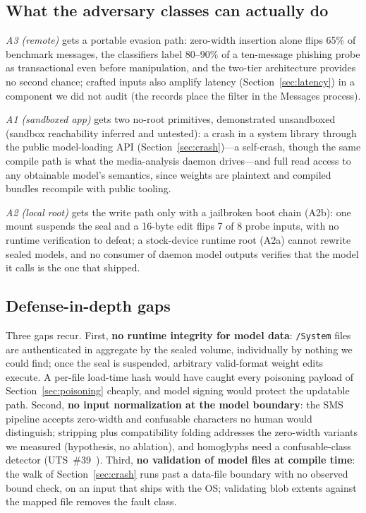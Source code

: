 \documentclass[letterpaper,twocolumn,10pt]{article}
\begin{document}
\subsection{What the adversary classes can actually do}

\emph{A3 (remote)} gets a portable evasion path: zero-width insertion alone
flips 65\% of benchmark messages, the classifiers label 80--90\% of a
ten-message phishing probe as transactional even before manipulation, and
the two-tier architecture provides no second chance; crafted inputs also
amplify latency (Section~\ref{sec:latency}) in a component we did not audit
(the records place the filter in the Messages process).

\emph{A1 (sandboxed app)} gets two no-root primitives, demonstrated
unsandboxed (sandbox reachability inferred and untested): a crash in a
system library through the public model-loading API
(Section~\ref{sec:crash})---a self-crash, though the same compile path is
what the media-analysis daemon drives---and full read
access to any obtainable model's semantics, since weights are plaintext
and compiled bundles recompile with public tooling.

\emph{A2 (local root)} gets the write path only with a jailbroken boot
chain (A2b): one mount suspends the seal and a 16-byte edit flips 7 of 8
probe inputs, with no runtime verification to defeat; a stock-device
runtime root (A2a) cannot rewrite sealed models, and no consumer of daemon
model outputs verifies that the model it calls is the one that shipped.

\subsection{Defense-in-depth gaps}

Three gaps recur.
First, \textbf{no runtime integrity for model data}: \texttt{/System} files
are authenticated in aggregate by the sealed volume, individually by
nothing we could find; once the seal is suspended, arbitrary valid-format
weight edits execute.
A per-file load-time hash would have caught every poisoning payload of
Section~\ref{sec:poisoning} cheaply, and model signing would protect the
updatable path.
Second, \textbf{no input normalization at the model boundary}: the SMS
pipeline accepts zero-width and confusable characters no human would
distinguish; stripping plus compatibility folding addresses the zero-width
variants we measured (hypothesis, no ablation), and homoglyphs need a
confusable-class detector (UTS~\#39~\cite{unicode_tr39}).
Third, \textbf{no validation of model files at compile time}: the walk of
Section~\ref{sec:crash} runs past a data-file boundary with no observed
bound check, on an input that ships with the OS; validating blob extents
against the mapped file removes the fault class.
\end{document}
